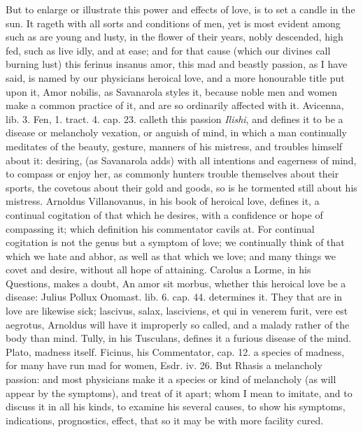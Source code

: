 But to enlarge or illustrate this power and effects of love, is to set
a candle in the sun. It rageth with all sorts and conditions of
men, yet is most evident among such as are young and lusty, in the
flower of their years, nobly descended, high fed, such as live idly,
and at ease; and for that cause (which our divines call burning lust)
this ferinus insanus amor, this mad and beastly passion, as I
have said, is named by our physicians heroical love, and a more
honourable title put upon it, Amor nobilis, as Savanarola styles
it, because noble men and women make a common practice of it, and are
so ordinarily affected with it. Avicenna, lib. 3. Fen, 1. tract. 4.
cap. 23. calleth this passion \emph{Ilishi}, and defines it to be a
disease or melancholy vexation, or anguish of mind, in which a man
continually meditates of the beauty, gesture, manners of his mistress,
and troubles himself about it: desiring, (as Savanarola adds) with all
intentions and eagerness of mind, to compass or enjoy her, as
commonly hunters trouble themselves about their sports, the covetous
about their gold and goods, so is he tormented still about his
mistress. Arnoldus Villanovanus, in his book of heroical love, defines
it, a continual cogitation of that which he desires, with a
confidence or hope of compassing it; which definition his commentator
cavils at. For continual cogitation is not the genus but a symptom of
love; we continually think of that which we hate and abhor, as well as
that which we love; and many things we covet and desire, without all
hope of attaining. Carolus a Lorme, in his Questions, makes a doubt, An
amor sit morbus, whether this heroical love be a disease: Julius Pollux
Onomast. lib. 6. cap. 44. determines it. They that are in love are
likewise sick; lascivus, salax, lasciviens, et qui in venerem
furit, vere est aegrotus, Arnoldus will have it improperly so called,
and a malady rather of the body than mind. Tully, in his Tusculans,
defines it a furious disease of the mind. Plato, madness itself.
Ficinus, his Commentator, cap. 12. a species of madness, for many have
run mad for women, Esdr. iv. 26. But Rhasis a melancholy passion:
and most physicians make it a species or kind of melancholy (as will
appear by the symptoms), and treat of it apart; whom I mean to imitate,
and to discuss it in all his kinds, to examine his several causes, to
show his symptoms, indications, prognostics, effect, that so it may be
with more facility cured.


